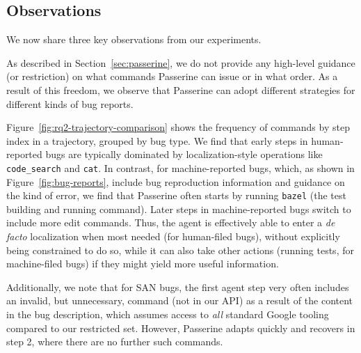 \vspace{-0.2cm}
\begin{center} 
\end{center}



\subsection{Observations}
We now share three key observations from our experiments.

As described in Section~\ref{sec:passerine}, 
we do not provide any high-level guidance (or restriction)
on what commands Passerine can issue or in what order.
As a result of this freedom, we observe that Passerine
can adopt different strategies for different kinds of bug reports.

Figure~\ref{fig:rq2-trajectory-comparison}
shows the frequency of commands by step index in a trajectory, grouped by bug type.
We find that early steps in human-reported bugs are typically dominated
by localization-style operations like 
\lstinline|code_search| and
\lstinline|cat|.
In contrast,
for machine-reported bugs, which, as shown in 
Figure~\ref{fig:bug-reports}, include bug reproduction
information and guidance on the kind of error,
we find that Passerine often starts by running
\lstinline|bazel| (the test building and running command). Later steps in
machine-reported bugs switch to include more edit commands.
Thus, the agent is effectively able to enter a \textit{de facto}
localization when most needed (for human-filed bugs), without
explicitly being constrained to do so, while it can also take
other actions (running tests, for machine-filed bugs) if they
might yield more useful information.
%

Additionally, we note that for SAN bugs, the first agent step
very often includes an invalid, but unnecessary, command (not in our API)
as a result of the content in the bug description, which
assumes access to \emph{all} standard Google tooling
compared to our restricted set. However, Passerine
adapts quickly and recovers in step 2, where there are no
further such commands.



